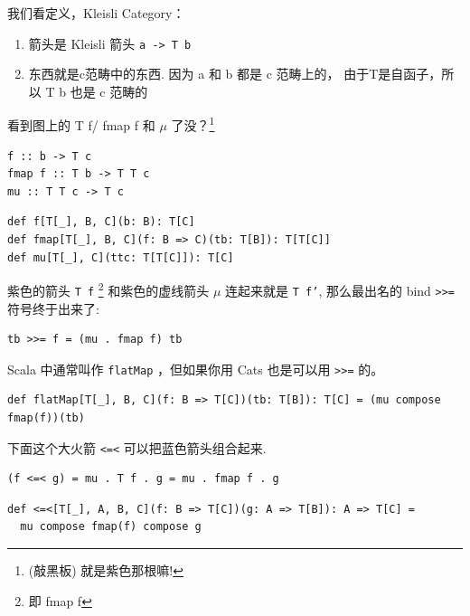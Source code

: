 \documentclass[letterspacing]{tufte-book}
\begin{document}
我们看定义，Kleisli Category：

\begin{enumerate}
\item 箭头是 Kleisli 箭头 \texttt{a -> T b}
\item 东西就是c范畴中的东西. 因为 a 和 b 都是 c 范畴上的， 由于T是自函子，所以 T b 也是 c 范畴的
\end{enumerate}

看到图上的 T f/ fmap f 和 \(\mu\) 了没？\footnote{(敲黑板) 就是紫色那根嘛!}

\lstset{language=haskell,label= ,caption= ,captionpos=b,numbers=none}
\begin{lstlisting}
f :: b -> T c
fmap f :: T b -> T T c
mu :: T T c -> T c
\end{lstlisting}

\lstset{language=scala,label= ,caption= ,captionpos=b,numbers=none}
\begin{lstlisting}
def f[T[_], B, C](b: B): T[C]
def fmap[T[_], B, C](f: B => C)(tb: T[B]): T[T[C]]
def mu[T[_], C](ttc: T[T[C]]): T[C]
\end{lstlisting}

紫色的箭头 \texttt{T f} \footnote{即 fmap f} 和紫色的虚线箭头 \(\mu\) 连起来就是 \texttt{T f'}, 那么最出名的 bind \texttt{>>=} 符号终于出来了:
\lstset{language=haskell,label= ,caption= ,captionpos=b,numbers=none}
\begin{lstlisting}
tb >>= f = (mu . fmap f) tb
\end{lstlisting}

Scala 中通常叫作 \texttt{flatMap} ，但如果你用 Cats 也是可以用 \texttt{>>=} 的。
\lstset{language=scala,label= ,caption= ,captionpos=b,numbers=none}
\begin{lstlisting}
def flatMap[T[_], B, C](f: B => T[C])(tb: T[B]): T[C] = (mu compose fmap(f))(tb)
\end{lstlisting}

下面这个大火箭 \texttt{<=<} 可以把蓝色箭头组合起来.
\lstset{language=haskell,label= ,caption= ,captionpos=b,numbers=none}
\begin{lstlisting}
(f <=< g) = mu . T f . g = mu . fmap f . g
\end{lstlisting}

\lstset{language=scala,label= ,caption= ,captionpos=b,numbers=none}
\begin{lstlisting}
def <=<[T[_], A, B, C](f: B => T[C])(g: A => T[B]): A => T[C] =
  mu compose fmap(f) compose g
\end{lstlisting}
\end{document}

